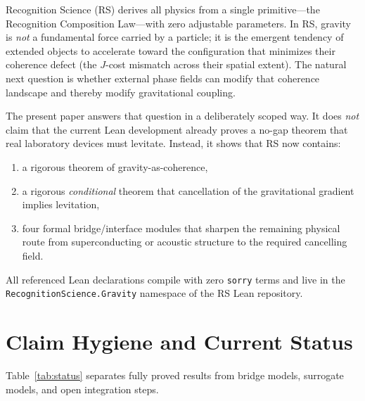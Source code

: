 \documentclass[11pt,a4paper]{article}
\begin{document}
Recognition Science (RS) derives all physics from a single primitive---the Recognition Composition Law---with zero adjustable parameters.
In RS, gravity is \emph{not} a fundamental force carried by a particle; it is the emergent tendency of extended objects to accelerate toward the configuration that minimizes their coherence defect (the $J$-cost mismatch across their spatial extent).
The natural next question is whether external phase fields can modify that coherence landscape and thereby modify gravitational coupling.

The present paper answers that question in a deliberately scoped way.
It does \emph{not} claim that the current Lean development already proves a no-gap theorem that real laboratory devices must levitate.
Instead, it shows that RS now contains:
\begin{enumerate}[leftmargin=2em]
    \item a rigorous theorem of gravity-as-coherence,
    \item a rigorous \emph{conditional} theorem that cancellation of the gravitational gradient implies levitation,
    \item four formal bridge/interface modules that sharpen the remaining physical route from superconducting or acoustic structure to the required cancelling field.
\end{enumerate}

All referenced Lean declarations compile with zero \texttt{sorry} terms and live in the \texttt{RecognitionScience.Gravity} namespace of the RS Lean repository.

\section{Claim Hygiene and Current Status}
\label{sec:status}

Table~\ref{tab:status} separates fully proved results from bridge models, surrogate models, and open integration steps.
\end{document}
